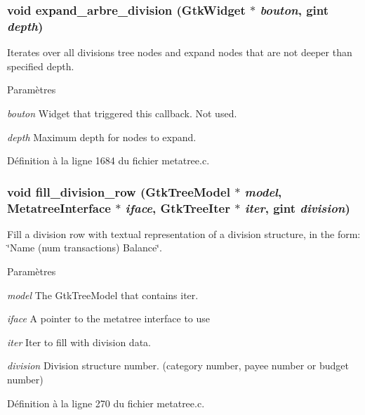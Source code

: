 \subsubsection[{expand\_\-arbre\_\-division}]{\setlength{\rightskip}{0pt plus 5cm}void expand\_\-arbre\_\-division (GtkWidget $\ast$ {\em bouton}, \/  gint {\em depth})}\label{metatree_8h_a69bc59e1ce9e70ce93b4206aed12d7f3}
Iterates over all divisions tree nodes and expand nodes that are not deeper than specified depth.


\begin{DoxyParams}{Paramètres}
\item[{\em bouton}]Widget that triggered this callback. Not used. \item[{\em depth}]Maximum depth for nodes to expand. \end{DoxyParams}


Définition à la ligne 1684 du fichier metatree.c.

\subsubsection[{fill\_\-division\_\-row}]{\setlength{\rightskip}{0pt plus 5cm}void fill\_\-division\_\-row (GtkTreeModel $\ast$ {\em model}, \/  {\bf MetatreeInterface} $\ast$ {\em iface}, \/  GtkTreeIter $\ast$ {\em iter}, \/  gint {\em division})}\label{metatree_8h_a3a39c8d7bec94526c1ce601db6bc0767}
Fill a division row with textual representation of a division structure, in the form: \char`\"{}Name (num transactions) Balance\char`\"{}.


\begin{DoxyParams}{Paramètres}
\item[{\em model}]The GtkTreeModel that contains iter. \item[{\em iface}]A pointer to the metatree interface to use \item[{\em iter}]Iter to fill with division data. \item[{\em division}]Division structure number. (category number, payee number or budget number) \end{DoxyParams}


Définition à la ligne 270 du fichier metatree.c.

